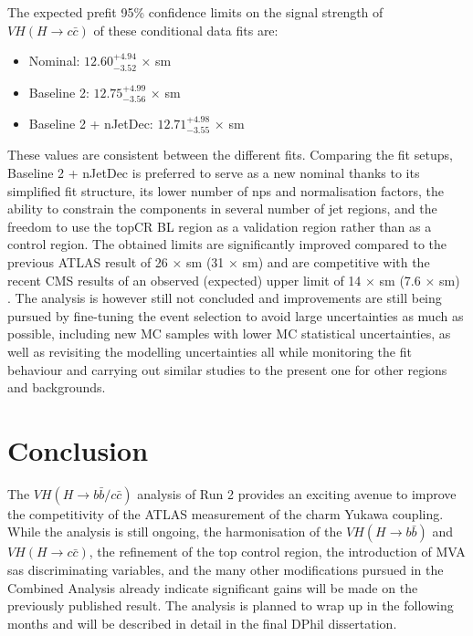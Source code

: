 The expected prefit 95\% confidence limits on the signal strength of $VH(H\rightarrow c\bar{c})$ of these conditional data fits are: 
\begin{itemize}
\item Nominal: $12.60^{+4.94}_{-3.52}$ × \gls{sm}
\item Baseline 2: $12.75^{+4.99}_{-3.56}$ × \gls{sm}
\item Baseline 2 + nJetDec: $12.71^{+4.98}_{-3.55}$ × \gls{sm}
\end{itemize}
These values are consistent between the different fits. Comparing the fit setups, Baseline 2 + nJetDec is preferred to serve as a new nominal thanks to its simplified fit structure, its lower number of \gls{np}s and normalisation factors, the ability to constrain the components in several number of jet regions, and the freedom to use the topCR BL region as a validation region rather than as a control region. The obtained limits are significantly improved compared to the previous ATLAS result of 26 × \gls{sm} (31 × \gls{sm}) \cite{Collaboration:2721696} and are competitive with the recent CMS results of an observed (expected) upper limit of 14 $\times$ \gls{sm} (7.6 $\times$ \gls{sm}) \cite{arXiv:2205.05550}. The analysis is however still not concluded and improvements are still being pursued by fine-tuning the event selection to avoid large uncertainties as much as possible, including new MC samples with lower MC statistical uncertainties, as well as revisiting the modelling uncertainties all while monitoring the fit behaviour and carrying out similar studies to the present one for other regions and backgrounds. 

\section{Conclusion}
The $VH(H\rightarrow b\bar{b}/c\bar{c})$ analysis of Run 2 provides an exciting avenue to improve the competitivity of the ATLAS measurement of the charm Yukawa coupling. While the analysis is still ongoing, the harmonisation of the $VH(H\rightarrow b\bar{b})$ and $VH(H\rightarrow c\bar{c})$, the refinement of the top control region, the introduction of MVA sas discriminating variables, and the many other modifications pursued in the Combined Analysis already indicate significant gains will be made on the previously published result. The analysis is planned to wrap up in the following months and will be described in detail in the final DPhil dissertation. 

\clearpage


